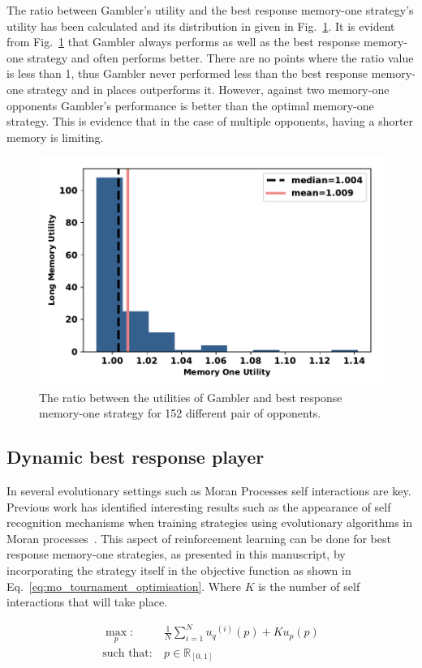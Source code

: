\documentclass[10pt]{article}
\newcommand{\R}{\mathbb{R}}
\begin{document}
The ratio between Gambler's utility and the best response memory-one strategy's utility has been calculated and its distribution in
given in Fig.~\ref{fig:utilities_gambler_mem_one}.
It is evident from Fig.~\ref{fig:utilities_gambler_mem_one} that
Gambler always performs as well as the best response memory-one strategy and often performs better. There are
no points where the ratio value is less than 1, thus Gambler never performed less
than the best response memory-one strategy and in places outperforms it.
However, against two memory-one opponents Gambler's performance is better than
the optimal memory-one strategy. This is evidence that in the case of multiple
opponents, having a
shorter memory is limiting.

\begin{figure}[!htbp]
    \centering
    \includegraphics[width=.5\textwidth]{img/gambler_performance_against_mem_one.pdf}
    \caption{The ratio between the utilities of Gambler and best response memory-one
    strategy for 152 different pair of opponents.}\label{fig:utilities_gambler_mem_one}
\end{figure}

\subsection{Dynamic best response player}

In several evolutionary settings
such as Moran Processes self interactions are key. Previous work has
identified interesting results such as the appearance of self recognition
mechanisms when training strategies using evolutionary algorithms in Moran
processes~\cite{Knight2018}. This aspect of reinforcement learning can be done for
best response memory-one strategies, as presented in this manuscript, by incorporating the strategy itself in the
objective function as shown in Eq.~\ref{eq:mo_tournament_optimisation}.
Where \(K\) is the number of self interactions that will take place.

\begin{equation}\label{eq:mo_evolutionary_optimisation}
\begin{aligned}
\max_p: & \ \frac{1}{N} \sum\limits_{i=1} ^ {N} {u_q}^{(i)} (p) + Ku_p(p)
\\
\text{such that}: & \ p \in \R_{[0, 1]}
\end{aligned}
\end{equation}
\end{document}
